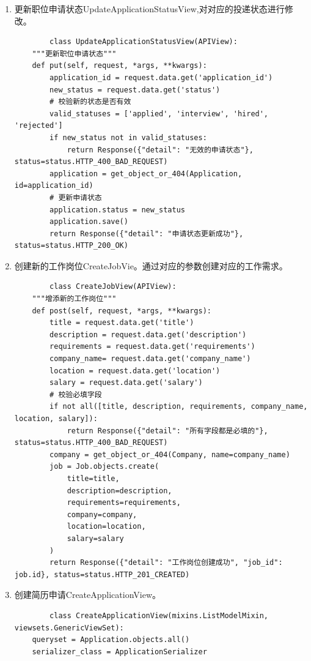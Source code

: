 \documentclass[UTF8,a4paper,10pt]{ctexart}
\begin{document}
\begin{enumerate}
\begin{lstlisting}
    \end{lstlisting}
    \item 更新职位申请状态UpdateApplicationStatusView,对对应的投递状态进行修改。
    \begin{lstlisting}
        class UpdateApplicationStatusView(APIView):
    """更新职位申请状态"""
    def put(self, request, *args, **kwargs):
        application_id = request.data.get('application_id')
        new_status = request.data.get('status')
        # 校验新的状态是否有效
        valid_statuses = ['applied', 'interview', 'hired', 'rejected']
        if new_status not in valid_statuses:
            return Response({"detail": "无效的申请状态"}, status=status.HTTP_400_BAD_REQUEST)
        application = get_object_or_404(Application, id=application_id)
        # 更新申请状态
        application.status = new_status
        application.save()
        return Response({"detail": "申请状态更新成功"}, status=status.HTTP_200_OK)
    \end{lstlisting}
    \item 创建新的工作岗位CreateJobVie。通过对应的参数创建对应的工作需求。
    \begin{lstlisting}
        class CreateJobView(APIView):
    """增添新的工作岗位"""
    def post(self, request, *args, **kwargs):
        title = request.data.get('title')
        description = request.data.get('description')
        requirements = request.data.get('requirements')
        company_name= request.data.get('company_name')
        location = request.data.get('location')
        salary = request.data.get('salary')
        # 校验必填字段
        if not all([title, description, requirements, company_name, location, salary]):
            return Response({"detail": "所有字段都是必填的"}, status=status.HTTP_400_BAD_REQUEST)
        company = get_object_or_404(Company, name=company_name)
        job = Job.objects.create(
            title=title,
            description=description,
            requirements=requirements,
            company=company,
            location=location,
            salary=salary
        )
        return Response({"detail": "工作岗位创建成功", "job_id": job.id}, status=status.HTTP_201_CREATED)
    \end{lstlisting}
    \item 创建简历申请CreateApplicationView。
    \begin{lstlisting}
        class CreateApplicationView(mixins.ListModelMixin, viewsets.GenericViewSet):
    queryset = Application.objects.all()
    serializer_class = ApplicationSerializer
    

\end{lstlisting}
\end{enumerate}
\end{document}
